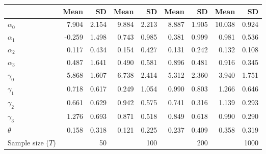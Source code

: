 
\begin{tabular}[t]{lrrrrrrrr}
\toprule
  & Mean & SD & Mean  & SD  & Mean   & SD   & Mean    & SD   \\
\midrule
$\alpha_{0}$ & 7.904 & 2.154 & 9.884 & 2.213 & 8.887 & 1.905 & 10.038 & 0.924\\
$\alpha_{1}$ & -0.259 & 1.498 & 0.743 & 0.985 & 0.381 & 0.999 & 0.981 & 0.536\\
$\alpha_{2}$ & 0.117 & 0.434 & 0.154 & 0.427 & 0.131 & 0.242 & 0.132 & 0.108\\
$\alpha_{3}$ & 0.487 & 1.641 & 0.490 & 0.581 & 0.896 & 0.481 & 0.916 & 0.345\\
$\gamma_{0}$ & 5.868 & 1.607 & 6.738 & 2.414 & 5.312 & 2.360 & 3.940 & 1.751\\
$\gamma_{1}$ & 0.718 & 0.617 & 0.249 & 1.054 & 0.990 & 0.803 & 1.266 & 0.646\\
$\gamma_{2}$ & 0.661 & 0.629 & 0.942 & 0.575 & 0.741 & 0.316 & 1.139 & 0.293\\
$\gamma_{3}$ & 1.276 & 0.693 & 0.871 & 0.518 & 0.849 & 0.618 & 0.990 & 0.290\\
$\theta$ & 0.158 & 0.318 & 0.121 & 0.225 & 0.237 & 0.409 & 0.358 & 0.319\\
Sample size ($T$) &  & 50 &  & 100 &  & 200 &  & 1000\\
\bottomrule
\end{tabular}
